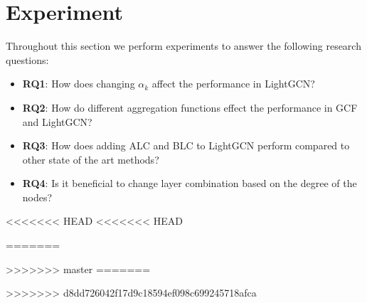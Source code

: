 \section{Experiment}
Throughout this section we perform experiments to answer the following research questions:
\begin{itemize}
    \item \textbf{RQ1}: How does changing $\alpha_k$ affect the performance in LightGCN?
    \item \textbf{RQ2}: How do different aggregation functions effect the performance in GCF and LightGCN?
    \item \textbf{RQ3}: How does adding ALC and BLC to LightGCN perform compared to other state of the art methods?
    \item \textbf{RQ4}: Is it beneficial to change layer combination based on the degree of the nodes?
\end{itemize}






<<<<<<< HEAD
<<<<<<< HEAD

=======

>>>>>>> master
=======

>>>>>>> d8dd726042f17d9c18594ef098c699245718afca

